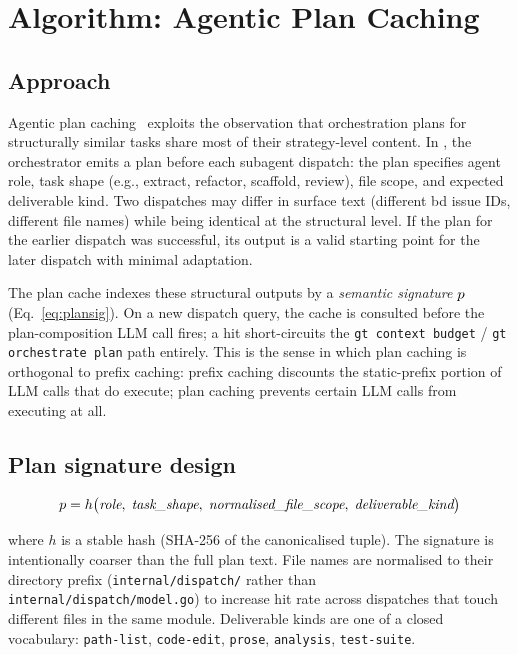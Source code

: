 \section{Algorithm: Agentic Plan Caching}
\label{sec:plancache}

\subsection{Approach}

Agentic plan caching~\cite{plancache} exploits the observation that
orchestration plans for structurally similar tasks share most of their
strategy-level content.  In \blackrim, the orchestrator emits a plan
before each subagent dispatch: the plan specifies agent role, task
shape (e.g., extract, refactor, scaffold, review), file scope, and
expected deliverable kind.  Two dispatches may differ in surface text
(different bd issue IDs, different file names) while being identical
at the structural level.  If the plan for the earlier dispatch was
successful, its output is a valid starting point for the later dispatch
with minimal adaptation.

The plan cache indexes these structural outputs by a
\emph{semantic signature} \(p\) (Eq.~\ref{eq:plansig}).  On a new
dispatch query, the cache is consulted before the plan-composition
LLM call fires; a hit short-circuits the \texttt{gt context budget}
/ \texttt{gt orchestrate plan} path entirely.  This is the sense in
which plan caching is orthogonal to prefix caching: prefix caching
discounts the static-prefix portion of LLM calls that do execute;
plan caching prevents certain LLM calls from executing at all.

\subsection{Plan signature design}

\begin{equation}
  p = h\bigl(
    \textit{role},\;
    \textit{task\_shape},\;
    \textit{normalised\_file\_scope},\;
    \textit{deliverable\_kind}
  \bigr)
  \label{eq:plansig}
\end{equation}

where \(h\) is a stable hash (SHA-256 of the canonicalised tuple).
The signature is intentionally coarser than the full plan text.
File names are normalised to their directory prefix
(\texttt{internal/dispatch/} rather than
\texttt{internal/dispatch/model.go}) to increase hit rate across
dispatches that touch different files in the same module.  Deliverable
kinds are one of a closed vocabulary: \texttt{path-list},
\texttt{code-edit}, \texttt{prose}, \texttt{analysis},
\texttt{test-suite}.

